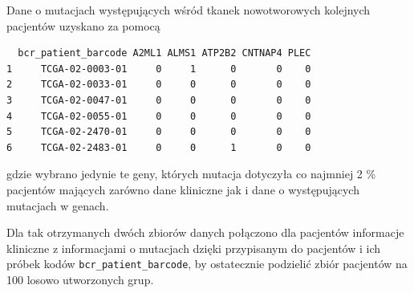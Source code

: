 Dane o mutacjach występujących wśród tkanek nowotworowych kolejnych
pacjentów uzyskano za pomocą

\begin{Shaded}
\begin{Highlighting}[]
\NormalTok{) ->}\StringTok{ }
\NormalTok{mutationsData[}\NormalTok{:}\NormalTok{, }\NormalTok{(}\NormalTok{,}\NormalTok{,}\NormalTok{,}\NormalTok{,}\NormalTok{,}\NormalTok{)]}
\end{Highlighting}
\end{Shaded}

\begin{verbatim}
  bcr_patient_barcode A2ML1 ALMS1 ATP2B2 CNTNAP4 PLEC
1     TCGA-02-0003-01     0     1      0       0    0
2     TCGA-02-0033-01     0     0      0       0    0
3     TCGA-02-0047-01     0     0      0       0    0
4     TCGA-02-0055-01     0     0      0       0    0
5     TCGA-02-2470-01     0     0      0       0    0
6     TCGA-02-2483-01     0     0      1       0    0
\end{verbatim}

gdzie wybrano jedynie te geny, których mutacja dotyczyła co najmniej 2
\% pacjentów mających zarówno dane kliniczne jak i dane o występujących
mutacjach w genach.

Dla tak otrzymanych dwóch zbiorów danych połączono dla pacjentów
informacje kliniczne z informacjami o mutacjach dzięki przypisanym do
pacjentów i ich próbek kodów \texttt{bcr\_patient\_barcode}, by
ostatecznie podzielić zbiór pacjentów na 100 losowo utworzonych grup.

\begin{Shaded}
\begin{Highlighting}[]
\NormalTok{(}\NormalTok{)}
 \NormalTok{) ->}\StringTok{ }
\NormalTok{(coxData_split[[}\NormalTok{]][}\NormalTok{(}\NormalTok{,}\NormalTok{), }\NormalTok{(}\NormalTok{,}\NormalTok{,}\NormalTok{,}\NormalTok{,}\NormalTok{,}\NormalTok{:}\NormalTok{)])}
\end{Highlighting}
\end{Shaded}

